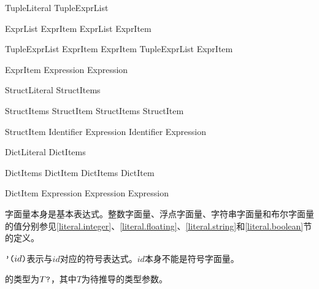 \begin{bnf}{TupleLiteral}
    \terminal{(} TupleExprList\bnfq \terminal{)}
\end{bnf}

\begin{bnf}{ExprList}
    ExprItem \br
    ExprList \terminal{,} ExprItem
\end{bnf}

\begin{bnf}{TupleExprList}
    ExprItem \terminal{,} ExprItem \br
    TupleExprList \terminal{,} ExprItem
\end{bnf}

\begin{bnf}{ExprItem}
    Expression \br
     Expression
\end{bnf}

\begin{bnf}{StructLiteral}
    \terminal{\{} StructItems \terminal{\}}
\end{bnf}

\begin{bnf}{StructItems}
    StructItem \br
    StructItems \terminal{,} StructItem
\end{bnf}

\begin{bnf}{StructItem}
    Identifier \terminal{:} Expression \br
    Identifier \br
     Expression
\end{bnf}

\begin{bnf}{DictLiteral}
    \terminal{\{|} DictItems\bnfq \terminal{|\}}
\end{bnf}

\begin{bnf}{DictItems}
    DictItem \br
    DictItems \terminal{,} DictItem
\end{bnf}

\begin{bnf}{DictItem}
    Expression \terminal{:} Expression \br
     Expression
\end{bnf}

\pnum
字面量本身是基本表达式。整数字面量、浮点字面量、字符串字面量和布尔字面量的值分别参见\ref{literal.integer}、\ref{literal.floating}、\ref{literal.string}和\ref{literal.boolean}节的定义。

\pnum
$\texttt{'(}id\texttt{)}$表示与$id$对应的符号表达式。$id$本身不能是符号字面量。

\pnum
{}的类型为$T\texttt{?}$，其中$T$为待推导的类型参数。

